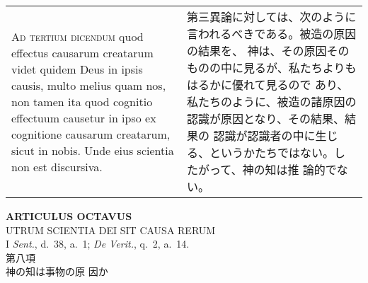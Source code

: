 \documentclass[10pt]{jsarticle} %
\begin{document}
\begin{longtable}{p{21em}p{21em}}
\\


{\scshape Ad tertium dicendum} quod effectus causarum creatarum videt
quidem Deus in ipsis causis, multo melius quam nos, non tamen ita quod
cognitio effectuum causetur in ipso ex cognitione causarum creatarum,
sicut in nobis. Unde eius scientia non est discursiva.

&

第三異論に対しては、次のように言われるべきである。被造の原因の結果を、
神は、その原因そのものの中に見るが、私たちよりもはるかに優れて見るので
あり、私たちのように、被造の諸原因の認識が原因となり、その結果、結果の
認識が認識者の中に生じる、というかたちではない。したがって、神の知は推
論的でない。


\end{longtable}
\newpage




\begin{center}
{\Large {\bf ARTICULUS OCTAVUS}}\\ {\large UTRUM SCIENTIA DEI SIT
CAUSA RERUM}\\ {\footnotesize I {\itshape Sent.}, d.~38, a.~1;
{\itshape De Verit.}, q.~2, a.~14.}\\ {\Large 第八項\\神の知は事物の原
因か}
\end{center}
\end{document}
